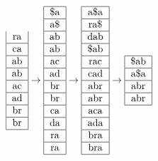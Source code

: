 \documentclass{article}
\begin{document}
\begin{equation*}
\begin{tabular}{|c|}
        ra \\ \hline
        ca \\ \hline
        ab \\ \hline
        ab \\ \hline
        ac \\ \hline
        ad \\ \hline
        br \\ \hline
        br \\ \hline
    \end{tabular}
    \rightarrow
    \begin{tabular}{|c|}\hline
        \$a \\ \hline
        a\$ \\ \hline
        ab \\ \hline
        ab \\ \hline
        ac \\ \hline
        ad \\ \hline
        br \\ \hline
        br \\ \hline
        ca \\ \hline
        da \\ \hline
        ra \\ \hline
        ra \\ \hline
    \end{tabular}
    \rightarrow
    \begin{tabular}{|c|}\hline
        a\$a \\ \hline
        ra\$ \\ \hline
        dab \\ \hline
        \$ab \\ \hline
        rac \\ \hline
        cad \\ \hline
        abr \\ \hline
        abr \\ \hline
        aca \\ \hline
        ada \\ \hline
        bra \\ \hline
        bra \\ \hline
    \end{tabular}
    \rightarrow
    \begin{tabular}{|c|}\hline
        \$ab \\ \hline
        a\$a \\ \hline
        abr \\ \hline
        abr \\ \hline

\end{tabular}
\end{equation*}
\end{document}
